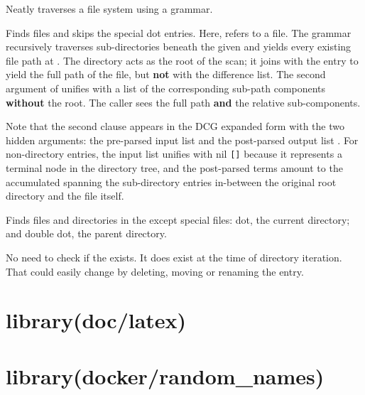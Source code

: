 \begin{description}
Neatly traverses a file system using a grammar.

Finds files and skips the special dot entries. Here,  refers
to a file. The grammar recursively traverses sub-directories beneath
the given  and yields every existing file path at
. The directory acts as the root of the scan; it joins with
the entry to yield the full path of the file, but \textbf{not} with the
difference list. The second  argument of  unifies
with a list of the corresponding sub-path components \textbf{without} the
root. The caller sees the full path \textbf{and} the relative
sub-components.

Note that the second clause appears in the DCG expanded form with the
two hidden arguments: the pre-parsed input list  and the
post-parsed output list . For non-directory entries, the input list
unifies with nil \verb$[]$ because it represents a terminal node in the
directory tree, and the post-parsed terms amount to the accumulated
 spanning the sub-directory entries in-between the original
root directory and the file itself.

Finds files and directories in the  except special files: dot,
the current directory; and double dot, the parent directory.

No need to check if the  exists. It does exist at the time of
directory iteration. That could easily change by deleting, moving or
renaming the entry.
\end{description}

\chapter{library(doc/latex)}\label{sec:latex}

\begin{description}
\end{description}

\chapter{library(docker/random_names)}\label{sec:randomnames}


